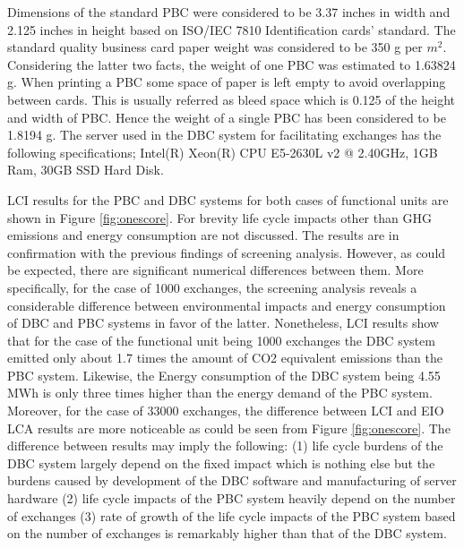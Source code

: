 \documentclass[conference]{IEEEtran}
\begin{document}
Dimensions of the standard PBC were considered to be 3.37 inches in width and 2.125 inches in height based on ISO/IEC 7810 Identification cards' standard.  The standard quality business card paper weight was considered to be 350 g per $m^2$. Considering the latter two facts, the weight of one PBC was estimated to 1.63824 g. When printing a PBC some space of paper is left empty to avoid overlapping between cards. This is usually referred as bleed space which is 0.125 of the height and width of PBC. Hence the weight of a single PBC has been considered to be 1.8194 g. The server used in the DBC system for facilitating exchanges has the following specifications; Intel(R) Xeon(R) CPU E5-2630L v2 @ 2.40GHz, 1GB Ram, 30GB SSD Hard Disk.

LCI results for the PBC and DBC systems for both cases of functional units are shown in Figure \ref{fig:onescore}. For brevity life cycle impacts other than GHG emissions and energy consumption are not discussed. The results are in confirmation with the previous findings of screening analysis. However, as could be expected, there are significant numerical differences between them. More specifically, for the case of 1000 exchanges, the screening analysis reveals a considerable difference between environmental impacts and energy consumption of DBC and PBC systems in favor of the latter. Nonetheless, LCI results show that for the case of the functional unit being 1000 exchanges the DBC system emitted only about 1.7 times the amount of CO2 equivalent emissions than the PBC system. Likewise, the Energy consumption of the DBC system being 4.55 MWh is only three times higher than the energy demand of the PBC system. Moreover, for the case of 33000 exchanges, the difference between LCI and EIO LCA results are more noticeable as could be seen from Figure \ref{fig:onescore}. The difference between results may imply the following: (1) life cycle burdens of the DBC system largely depend on the fixed impact which is nothing else but the burdens caused by development of the DBC software and manufacturing of server hardware (2) life cycle impacts of the PBC system heavily depend on the number of exchanges (3) rate of growth of the life cycle impacts of the PBC system based on the number of exchanges is remarkably higher than that of the DBC system.
\end{document}

